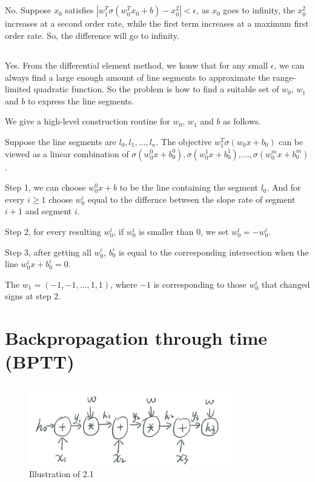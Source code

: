 \documentclass[12pt]{article}
\begin{document}
\subsection{}
No. Suppose $x_{0}$ satisfies $|w_1^T\sigma(w_0^T x_0 + b) - x_0^2| < \epsilon$, as $x_{0}$ goes to infinity, the $x_0^2$ increases at a second order rate, while the first term increases at a maximum first order rate. So, the difference will go to infinity.

\subsection{}
Yes. From the differential element method, we konw that for any small $\epsilon$, we can always find a large enough amount of line segments to approximate the range-limited quadratic function. So the problem is how to find a suitable set of $w_0$, $w_1$ and $b$ to express the line segments.

We give a high-level construction routine for $w_0$, $w_1$ and $b$ as follows.

Suppose the line segments are $l_0, l_1, \dots, l_n$. The objective $w_1^T \sigma(w_0 x + b_0)$ can be viewed as a linear combination of $\sigma(w_0^0 x + b_0^0), \sigma(w_0^1 x + b_0^1), \dots, \sigma(w_0^m x + b_0^m)$.

Step 1, we can choose $w_0^0 x + b$ to be the line containing the segment $l_0$. And for every $i \ge 1$ choose $w_0^i$ equal to the differnce between the slope rate of segment $i+1$ and segment $i$.

Step 2, for every resulting $w_0^i$, if $w_0^i$ is smaller than 0, we set $w_0^i = -w_0^i$.

Step 3, after getting all $w_0^i$, $b_0^i$ is equal to the corresponding intersection when the line $w_0^i x + b_0^i = 0$. 

The $w_1 = (-1, -1, \dots, 1, 1)$, where $-1$ is corresponding to those $w_0^i$ that changed signs at step 2.
\newpage

\section{Backpropagation through time (BPTT)}
\subsection{}
\begin{figure}[h]
    \centering
    \includegraphics[width=0.8\textwidth]{imgs/2-1.jpg}
    \caption{Illustration of 2.1}
    \label{fig:2-1}
\end{figure}
\end{document}
